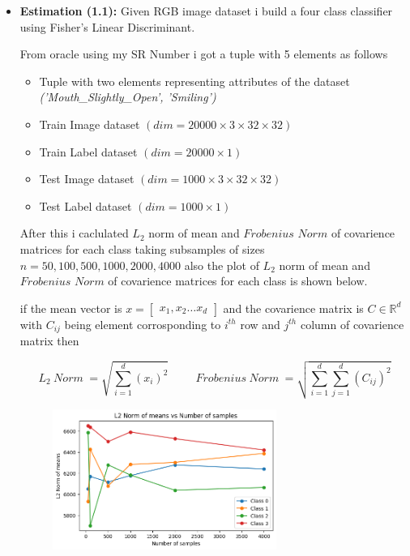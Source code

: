 \documentclass{article}
\begin{document}
\begin{itemize}
    \item \textbf{Estimation (1.1):} Given RGB image dataset i build a four class classifier using Fisher's Linear Discriminant.
    
    From oracle using my SR Number i got a tuple with 5 elements as follows
    \begin{itemize}
        \item Tuple with two elements representing attributes of the dataset \textit{('Mouth\_Slightly\_Open', 'Smiling')}
        \item Train Image dataset $(dim = 20000 \times 3 \times 32 \times 32)$
        \item Train Label dataset $(dim = 20000 \times 1)$
        \item Test Image dataset  $(dim = 1000 \times 3 \times 32 \times 32)$
        \item Test Label dataset $(dim = 1000 \times 1)$
    \end{itemize}
    After this i caclulated $L_2$ norm of mean and $Frobenius$ $Norm$ of covarience matrices for each class taking subsamples of sizes $n=50,100,500,1000,2000,4000$ also the plot of $L_2$ norm of mean and $Frobenius$ $Norm$ of covarience matrices for each class is shown below. 
    
    if the mean vector is $x=\begin{bmatrix}
        x_1 , x_2 \dots x_d
    \end{bmatrix}$ and the covarience matrix is $C \in \mathbb{R}^d$ with $C_{ij}$ being element corrosponding to $i^{th}$ row and $j^{th}$ column of covarience matrix then 

    \[
    L_2 \hspace{3pt} Norm \hspace{3pt}= \sqrt{\sum_{i=1}^{d} (x_i)^2} \hspace{1cm} Frobenius \hspace{3pt} Norm \hspace{3pt} = \sqrt{\sum_{i=1}^{d} \sum_{j=1}^{d} (C_{ij})^2}
    \]
    \begin{figure}[h]
        \centering
        \includegraphics[width=0.69\textwidth]{L2_Norm.png} %
        \label{fig:L2_Norm}
    \end{figure}


\end{itemize}
\end{document}
